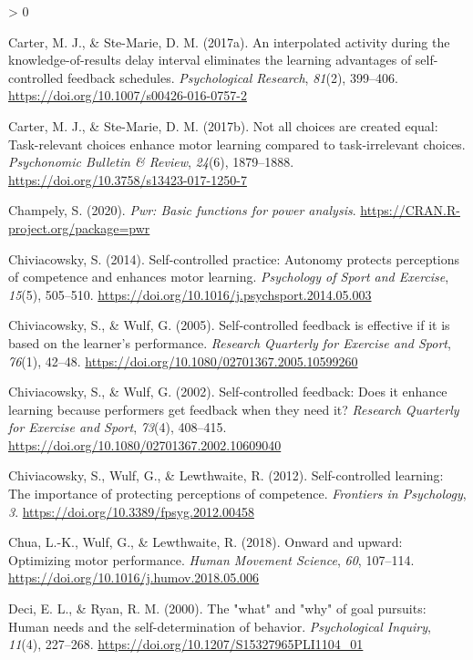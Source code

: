 \documentclass[
  english,
  man,floatsintext]{apa7}
\newlength{\cslhangindent}
\newenvironment{CSLReferences}[2] %
 {%
  \setlength{\parindent}{0pt}
  \ifodd #1 \everypar{\setlength{\hangindent}{\cslhangindent}}\ignorespaces\fi
  \ifnum #2 > 0
  \setlength{\parskip}{#2\baselineskip}
  \fi
 }%
 {}
\begin{document}
\begin{CSLReferences}{1}{0}
\leavevmode\hypertarget{ref-carter2017b}{}%
Carter, M. J., \& Ste-Marie, D. M. (2017a). An interpolated activity during the knowledge-of-results delay interval eliminates the learning advantages of self-controlled feedback schedules. \emph{Psychological Research}, \emph{81}(2), 399--406. \url{https://doi.org/10.1007/s00426-016-0757-2}

\leavevmode\hypertarget{ref-carter2017a}{}%
Carter, M. J., \& Ste-Marie, D. M. (2017b). Not all choices are created equal: Task-relevant choices enhance motor learning compared to task-irrelevant choices. \emph{Psychonomic Bulletin \& Review}, \emph{24}(6), 1879--1888. \url{https://doi.org/10.3758/s13423-017-1250-7}

\leavevmode\hypertarget{ref-R-pwr}{}%
Champely, S. (2020). \emph{Pwr: Basic functions for power analysis}. \url{https://CRAN.R-project.org/package=pwr}

\leavevmode\hypertarget{ref-chiviacowsky2014}{}%
Chiviacowsky, S. (2014). Self-controlled practice: Autonomy protects perceptions of competence and enhances motor learning. \emph{Psychology of Sport and Exercise}, \emph{15}(5), 505--510. \url{https://doi.org/10.1016/j.psychsport.2014.05.003}

\leavevmode\hypertarget{ref-chiviacowsky2005}{}%
Chiviacowsky, S., \& Wulf, G. (2005). Self-controlled feedback is effective if it is based on the learner's performance. \emph{Research Quarterly for Exercise and Sport}, \emph{76}(1), 42--48. \url{https://doi.org/10.1080/02701367.2005.10599260}

\leavevmode\hypertarget{ref-chiviacowsky2002}{}%
Chiviacowsky, S., \& Wulf, G. (2002). Self-controlled feedback: Does it enhance learning because performers get feedback when they need it? \emph{Research Quarterly for Exercise and Sport}, \emph{73}(4), 408--415. \url{https://doi.org/10.1080/02701367.2002.10609040}

\leavevmode\hypertarget{ref-chiviacowsky2012}{}%
Chiviacowsky, S., Wulf, G., \& Lewthwaite, R. (2012). Self-controlled learning: The importance of protecting perceptions of competence. \emph{Frontiers in Psychology}, \emph{3}. \url{https://doi.org/10.3389/fpsyg.2012.00458}

\leavevmode\hypertarget{ref-chua2018}{}%
Chua, L.-K., Wulf, G., \& Lewthwaite, R. (2018). Onward and upward: Optimizing motor performance. \emph{Human Movement Science}, \emph{60}, 107--114. \url{https://doi.org/10.1016/j.humov.2018.05.006}

\leavevmode\hypertarget{ref-deci2000}{}%
Deci, E. L., \& Ryan, R. M. (2000). The {"}what{"} and {"}why{"} of goal pursuits: Human needs and the self-determination of behavior. \emph{Psychological Inquiry}, \emph{11}(4), 227--268. \url{https://doi.org/10.1207/S15327965PLI1104_01}


\end{CSLReferences}
\end{document}
